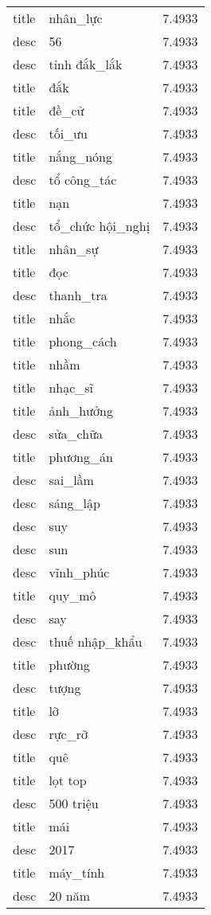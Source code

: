 \documentclass{article}
\begin{document}
\begin{tabular}{lll}
title & nhân\_lực & 7.4933\\
desc & 56 & 7.4933\\
desc & tỉnh đắk\_lắk & 7.4933\\
title & đắk & 7.4933\\
title & đề\_cử & 7.4933\\
desc & tối\_ưu & 7.4933\\
title & nắng\_nóng & 7.4933\\
desc & tổ công\_tác & 7.4933\\
title & nạn & 7.4933\\
desc & tổ\_chức hội\_nghị & 7.4933\\
title & nhân\_sự & 7.4933\\
title & đọc & 7.4933\\
desc & thanh\_tra & 7.4933\\
title & nhắc & 7.4933\\
title & phong\_cách & 7.4933\\
title & nhầm & 7.4933\\
title & nhạc\_sĩ & 7.4933\\
title & ảnh\_hưởng & 7.4933\\
desc & sửa\_chữa & 7.4933\\
title & phương\_án & 7.4933\\
desc & sai\_lầm & 7.4933\\
desc & sáng\_lập & 7.4933\\
desc & suy & 7.4933\\
desc & sun & 7.4933\\
desc & vĩnh\_phúc & 7.4933\\
title & quy\_mô & 7.4933\\
desc & say & 7.4933\\
desc & thuế nhập\_khẩu & 7.4933\\
title & phường & 7.4933\\
desc & tượng & 7.4933\\
title & lỡ & 7.4933\\
desc & rực\_rỡ & 7.4933\\
title & quê & 7.4933\\
title & lọt top & 7.4933\\
desc & 500 triệu & 7.4933\\
title & mái & 7.4933\\
desc & 2017 & 7.4933\\
title & máy\_tính & 7.4933\\
desc & 20 năm & 7.4933\\

\end{tabular}
\end{document}
